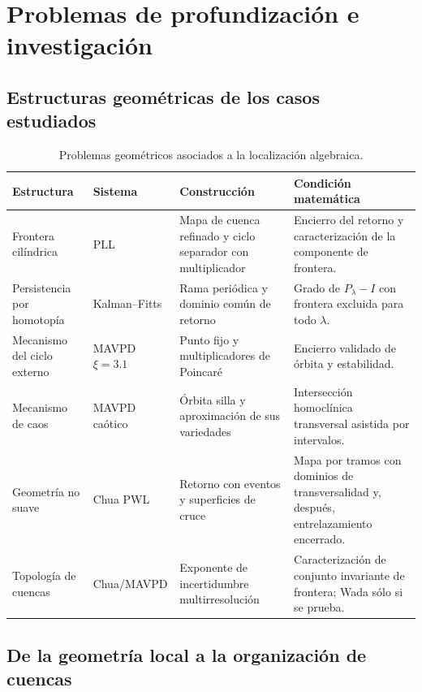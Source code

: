 \section{Problemas de profundización e investigación}
\label{sec:geo-study-plan}

\HAFOCardFuture

\subsection{Estructuras geométricas de los casos estudiados}

\begin{table}[H]
\centering
\caption{Problemas geométricos asociados a la localización algebraica.}
\label{geo:tab:projects}
\small
\begin{tabularx}{\textwidth}{@{}L{0.21\textwidth}L{0.20\textwidth}YY@{}}
\toprule
Estructura & Sistema & Construcción & Condición matemática \\
\midrule
Frontera cilíndrica & PLL & Mapa de cuenca refinado y ciclo separador con
multiplicador & Encierro del retorno y caracterización de la componente de
frontera. \\
Persistencia por homotopía & Kalman--Fitts & Rama periódica y dominio común de
retorno & Grado de \(P_\lambda-I\) con frontera excluida para todo \(\lambda\).
\\
Mecanismo del ciclo externo & MAVPD \(\xi=3.1\) & Punto fijo y multiplicadores
de Poincaré & Encierro validado de órbita y estabilidad. \\
Mecanismo de caos & MAVPD caótico & Órbita silla y aproximación de sus
variedades & Intersección homoclínica transversal asistida por intervalos. \\
Geometría no suave & Chua PWL & Retorno con eventos y superficies de cruce &
Mapa por tramos con dominios de transversalidad y, después, entrelazamiento
encerrado. \\
Topología de cuencas & Chua/MAVPD & Exponente de incertidumbre multirresolución
& Caracterización de conjunto invariante de frontera; Wada sólo si se prueba.
\\
\bottomrule
\end{tabularx}
\end{table}

\subsection{De la geometría local a la organización de cuencas}

